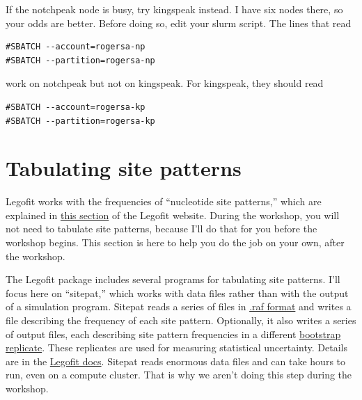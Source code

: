 \documentclass[11pt]{article}
\begin{document}
If the notchpeak node is busy, try kingspeak instead. I have six nodes
there, so your odds are better. Before doing so, edit your slurm
script. The lines that read
\begin{verbatim}
#SBATCH --account=rogersa-np
#SBATCH --partition=rogersa-np
\end{verbatim}
work on notchpeak but not on kingspeak. For kingspeak, they should read
\begin{verbatim}
#SBATCH --account=rogersa-kp
#SBATCH --partition=rogersa-kp
\end{verbatim}

\section{Tabulating site patterns}
\label{sec.tabulate}
Legofit works with the frequencies of ``nucleotide site patterns,''
which are explained in 
\href{http://alanrogers.github.io/legofit/html/index.html#sitepattern}{this
  section} of the Legofit website. During the workshop, you will not
need to tabulate site patterns, because I'll do that for you before
the workshop begins. This section is here to help you do the job on
your own, after the workshop.

The Legofit package includes several programs for tabulating site
patterns. I'll focus here on ``sitepat,'' which works with data files
rather than with the output of a simulation program. Sitepat reads a
series of files in
\href{http://alanrogers.github.io/legofit/html/index.html#sitepattern}{.raf
  format} and writes a file describing the frequency of each site
pattern. Optionally, it also writes a series of output files, each
describing site pattern frequencies in a different
\href{https://en.wikipedia.org/wiki/Bootstrapping_(statistics)}{bootstrap
  replicate}. These replicates are used for measuring statistical
uncertainty. Details are in the
\href{https://alanrogers.github.io/legofit/html/sitepat.html}{Legofit
  docs}. Sitepat reads enormous data files and can take hours to run,
even on a compute cluster. That is why we aren't doing this step
during the workshop.
\end{document}
